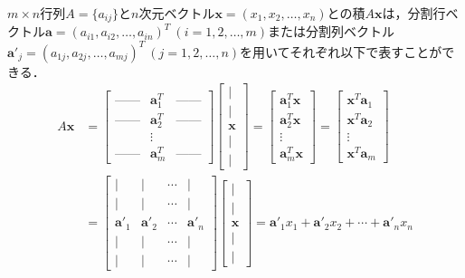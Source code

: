 \begin{theo}
$m\times n$行列$A=\{a_{ij}\}$と$n$次元ベクトル${\bm x}=(x_1,x_2,\ldots,x_n)$との積$A{\bm x}$は，分割行ベクトル${\bm a}=(a_{i1},a_{i2},\ldots,a_{in})^T~(i=1,2,\ldots,m)$または分割列ベクトル${\bm a}'_j=(a_{1j},a_{2j},\ldots,a_{mj})^T~(j=1,2,\ldots,n)$を用いてそれぞれ以下で表すことができる．
\begin{align}
A{\bm x}&=
\begin{bmatrix}
\mbox{------} & {\bm a}_1^T & \mbox{------} \\
\mbox{------} & {\bm a}_2^T & \mbox{------} \\
 & \vdots & \\
\mbox{------} & {\bm a}_m^T & \mbox{------}
\end{bmatrix}
\begin{bmatrix}
| \\[-2pt]
| \\
{\bm x} \\
| \\[-2pt]
|
\end{bmatrix}
=
\begin{bmatrix}
{\bm a}_1^T {\bm x} \\
{\bm a}_2^T {\bm x} \\
\vdots \\
{\bm a}_m^T {\bm x}  
\end{bmatrix}
=
\begin{bmatrix}
{\bm x}^T {\bm a}_1 \\
{\bm x}^T {\bm a}_2 \\
\vdots \\
{\bm x}^T {\bm a}_m  
\end{bmatrix}\label{tenkai1}\\
&=
\begin{bmatrix}
| & | & \cdots & | \\[-2pt]
| & | & \cdots & | \\
{\bm a}'_1 & {\bm a}'_2 & \cdots & {\bm a}'_n \\
| & | & \cdots & |	\\[-2pt]
| & | & \cdots & |
\end{bmatrix}
\begin{bmatrix}
| \\[-2pt]
| \\
{\bm x} \\
| \\[-2pt]
|
\end{bmatrix}
={\bm a}'_1x_1+{\bm a}'_2x_2+\cdots +{\bm a}'_nx_n \label{tenkai2}
\end{align}
\end{theo}
